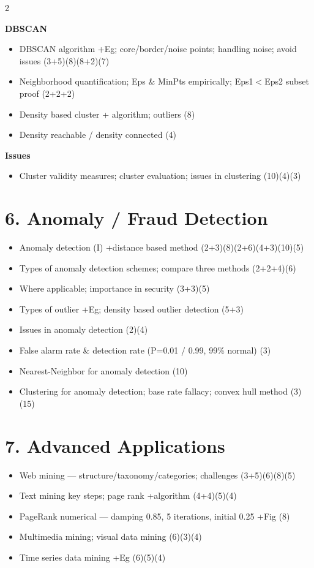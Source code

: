\documentclass[10pt]{article}
\begin{document}
\begin{multicols}{2}
\begin{itemize}
\end{itemize}
\textbf{DBSCAN}
\begin{itemize}
  \item DBSCAN algorithm +Eg; core/border/noise points; handling noise; avoid issues \hfill (3+5)(8)(8+2)(7)
  \item Neighborhood quantification; Eps \& MinPts empirically; Eps1$<$Eps2 subset proof \hfill (2+2+2)
  \item Density based cluster + algorithm; outliers \hfill (8)
  \item Density reachable / density connected \hfill (4)
\end{itemize}
\textbf{Issues}
\begin{itemize}
  \item Cluster validity measures; cluster evaluation; issues in clustering \hfill (10)(4)(3)
\end{itemize}

\section*{6. Anomaly / Fraud Detection}
\begin{itemize}
  \item Anomaly detection (I) +distance based method \hfill (2+3)(8)(2+6)(4+3)(10)(5)
  \item Types of anomaly detection schemes; compare three methods \hfill (2+2+4)(6)
  \item Where applicable; importance in security \hfill (3+3)(5)
  \item Types of outlier +Eg; density based outlier detection \hfill (5+3)
  \item Issues in anomaly detection \hfill (2)(4)
  \item False alarm rate \& detection rate (P=0.01 / 0.99, 99\% normal) \hfill (3)
  \item Nearest-Neighbor for anomaly detection \hfill (10)
  \item Clustering for anomaly detection; base rate fallacy; convex hull method \hfill (3)(15)
\end{itemize}

\section*{7. Advanced Applications}
\begin{itemize}
  \item Web mining --- structure/taxonomy/categories; challenges \hfill (3+5)(6)(8)(5)
  \item Text mining key steps; page rank +algorithm \hfill (4+4)(5)(4)
  \item PageRank numerical --- damping 0.85, 5 iterations, initial 0.25 +Fig \hfill (8)
  \item Multimedia mining; visual data mining \hfill (6)(3)(4)
  \item Time series data mining +Eg \hfill (6)(5)(4)
\end{itemize}

\end{multicols}
\end{document}
